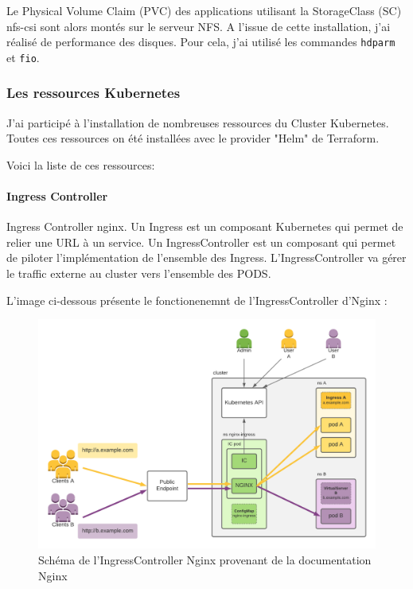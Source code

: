 \documentclass[12pt]{article}
\begin{document}
Le Physical Volume Claim (PVC) des applications utilisant la StorageClass (SC) nfs-csi sont alors montés sur le serveur NFS.
A l'issue de cette installation, j'ai réalisé de performance des disques.
Pour cela, j'ai utilisé les commandes \verb|hdparm| et \verb|fio|.

\subsubsection{Les ressources \gls{Kubernetes}}
J'ai participé à l'installation de nombreuses ressources du Cluster \gls{Kubernetes}.
Toutes ces ressources on été installées avec le provider "Helm" de Terraform.

Voici la liste de ces ressources:
\paragraph{Ingress Controller}
Ingress Controller nginx. Un Ingress est un composant \gls{Kubernetes} qui permet de relier une URL à un service.
Un IngressController est un composant qui permet de piloter l'implémentation de l'ensemble des Ingress.
L'IngressController va gérer le traffic externe au \gls{cluster} vers l'ensemble des PODS.

L'image ci-dessous présente le fonctionenemnt de l'IngressController d'Nginx :

\begin{figure}[!ht]
    \centering
        \includegraphics[width=\textwidth]{src/graph_nginx.png}
    \caption{Schéma de l'IngressController Nginx provenant de la documentation Nginx}
    \label{fig:graph_nginx.png}
\end{figure}
\end{document}
